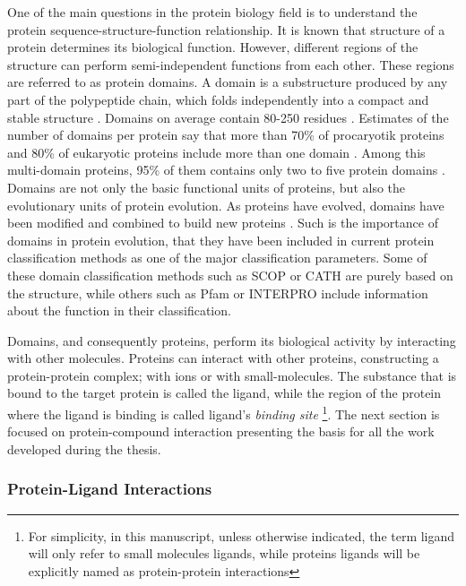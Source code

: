 \documentclass[12pt, b5paper,twoside]{tesi_upf}
\begin{document}
\par One of the main questions in the protein biology field is to understand the protein sequence-structure-function relationship. It is known that structure of a protein determines its biological function. However, different regions of the structure can perform semi-independent functions from each other. These regions are referred to as protein domains. A domain is a substructure produced by any part of the polypeptide chain, which folds independently into a compact and stable structure \cite{Richardson1981, Bork1991, DomainDef}. Domains on average contain 80-250 residues \cite{Islam1995}. Estimates of the number of domains per protein say that more than 70\% of procaryotik proteins and 80\% of eukaryotic proteins include more than one domain \cite{Han2007, Chothia2003}. Among this multi-domain proteins, 95\% of them contains only two to five protein domains \cite{Han2007}.  Domains are not only the basic functional units of proteins, but also the evolutionary units of protein evolution. As proteins have evolved, domains have been modified and combined to build new proteins \cite{Vogel2004, Apic2001}. 
Such is the importance  of domains in protein evolution, that they have been included in current protein classification methods as one of the major classification parameters. Some of these domain classification methods such as SCOP \cite{Murzin1995} or CATH \cite{Orengo1997} are purely based on the structure, while others such as Pfam \cite{Bateman2002} or INTERPRO \cite{Hunter2009} include information about the function in their classification. 

\par Domains, and consequently proteins, perform its biological activity by interacting with other molecules. Proteins can interact with other proteins, constructing a protein-protein complex; with ions or with small-molecules. The substance that is bound to the target protein is called the ligand, while the region of the protein where the ligand is binding is called ligand's \textit{binding site} \footnote{For simplicity, in this manuscript, unless otherwise indicated, the term ligand will only refer to small molecules ligands, while proteins ligands will be explicitly named as protein-protein interactions}. The next section is focused on protein-compound interaction presenting the basis for all the work developed during the thesis. 



\subsubsection{Protein-Ligand Interactions} \label{ligand_intect}
\end{document}
